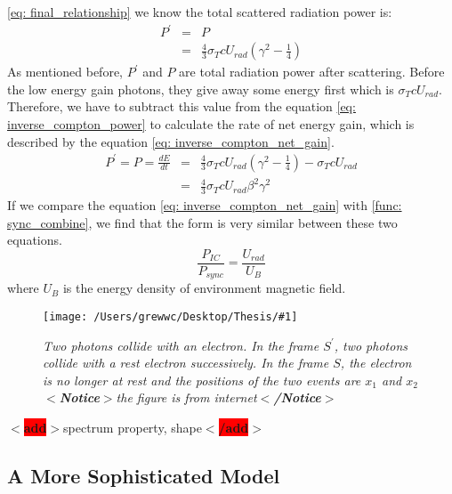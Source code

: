 \documentclass[12pt]{report}
\newcommand{\mycaption}[1]{\caption{\textit{\footnotesize #1}}}
\newcommand{\singleFig}[3]{
 \begin{figure}[!ht]
  \centering
  \texttt{[image: /Users/grewwc/Desktop/Thesis/\#1]}
  \mycaption{#3}
 \label{fig: #1}
 \end{figure}
 \vspace{0.5cm} 
}
\newcommand{\add}[1]{
  $<$\colorbox{red}{\textbf{add}}$>$#1$<$\colorbox{red}{\textbf{/add}}$>$
}
\newcommand{\Notice}[1]{
  $<$\textbf{Notice}$>$#1$<$\textbf{/Notice}$>$
}
\begin{document}
          \ref{eq: final_relationship} we know the total scattered radiation power is:
          \begin{eqnarray}
            \label{eq: inverse_compton_power}
            P^{\prime} &=& P  \nonumber \\
                       &=& \frac{4}{3} \sigma_{T} c U_{rad} \left(\gamma^2 - \frac{1}{4}\right)
          \end{eqnarray}
          As mentioned before, $P^{\prime}$ and $P$ are total radiation power after scattering. Before the 
          low energy gain photons, they give away some energy first which is $\sigma_{T} c U_{rad}$. 
          Therefore, we have to subtract this value from the equation \ref{eq: inverse_compton_power} to 
          calculate the rate of net energy gain, which is described by the equation 
          \ref{eq: inverse_compton_net_gain}.
          \begin{eqnarray}
            \label{eq: inverse_compton_net_gain}
            P^{\prime} = P = \frac{dE}{dt} &=& \frac{4}{3} \sigma_{T} c U_{rad} \left(\gamma^2 - \frac{1}{4}\right) - \sigma_{T} c U_{rad} \nonumber \\
                                           &=& \frac{4}{3} \sigma_{T} c U_{rad} \beta^{2} \gamma^{2}
          \end{eqnarray}
          If we compare the equation \ref{eq: inverse_compton_net_gain} with \ref{func: sync_combine}, we 
          find that the form is very similar between these two equations. 
          \begin{equation}
            \label{eq: comparision_inverse_compton_and_sync}
            \frac{P_{IC}}{P_{sync}} = \frac{U_{rad}}{U_{B}}
          \end{equation}
          where $U_{B}$ is the energy density of environment magnetic field. 

          \vspace{1cm}
          \singleFig{inverse_compton_time_interval}{0.45}{Two photons collide with an electron. 
            In the frame $S^{\prime}$, two photons collide with a rest electron successively.
            In the frame $S$, the electron is no longer at rest and the positions of the two events 
            are $x_1$ and $x_2$ \Notice{the figure is from internet}}

          \add{spectrum property, shape}

        
          \subsection{A More Sophisticated Model}
\end{document}

